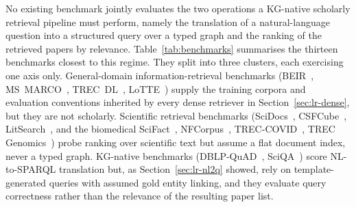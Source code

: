 No existing benchmark jointly evaluates the two operations a
KG-native scholarly retrieval pipeline must perform, namely the
translation of a natural-language question into a structured query over
a typed graph and the ranking of the retrieved papers by relevance.
Table~\ref{tab:benchmarks} summarises the thirteen benchmarks closest
to this regime. They split into three clusters, each exercising one
axis only. General-domain information-retrieval benchmarks
(BEIR~\cite{thakur2021beir}, MS~MARCO~\cite{msmarco},
TREC~DL~\cite{trecdl2019,trecdl2020},
LoTTE~\cite{santhanam2022colbertv2}) supply the training corpora and
evaluation conventions inherited by every dense retriever in
Section~\ref{sec:lr-dense}, but they are not scholarly. Scientific
retrieval benchmarks
(SciDocs~\cite{cohan2020specter}, CSFCube~\cite{mysore2021csfcube},
LitSearch~\cite{ajith2024litsearch}, and the biomedical
SciFact~\cite{scifact}, NFCorpus~\cite{nfcorpus},
TREC-COVID~\cite{voorhees2021treccovid}, TREC
Genomics~\cite{trecgen}) probe ranking over scientific text but
assume a flat document index, never a typed graph. KG-native
benchmarks (DBLP-QuAD~\cite{banerjee2023dblpquad},
SciQA~\cite{auer2023sciqa}) score NL-to-SPARQL translation but, as
Section~\ref{sec:lr-nl2q} showed, rely on template-generated
queries with assumed gold entity linking, and they evaluate query
correctness rather than the relevance of the resulting paper list.